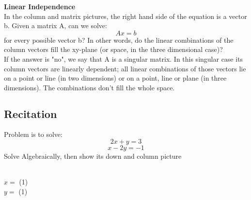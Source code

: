 \documentclass{ximera}
\begin{document}
\noindent
\textbf{Linear Independence} \\

\noindent
In the column and matrix pictures, the right hand side of the equation is a vector b. Given a matrix A, can we solve:
\[Ax = b\]
\noindent
for every possible vector b? In other words, do the linear combinations of the column vectors fill the xy-plane (or space, in the three dimensional case)? \\

\noindent
If the answer is "no", we say that A is a singular matrix. In this singular case its column vectors are linearly dependent; all linear combinations of those vectors lie on a point or line (in two dimensions) or on a point, line or plane (in three dimensions). The combinations don't fill the whole space.

\subsection*{Recitation}

\noindent
\begin{question}
Problem is to solve:
\[2x+y = 3\]
\[x-2y = -1\]
Solve Algebraically, then show its down and column picture
\begin{solution}\\
$x = $ \answer(1)\\
$y= $ \answer(1)
\end{solution}

\end{question}
\end{document}
